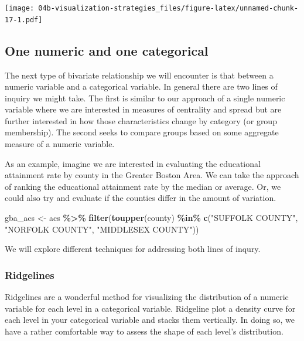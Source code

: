 \documentclass[
]{book}
\newenvironment{Shaded}{\begin{snugshade}}{\end{snugshade}}
\newcommand{\KeywordTok}[1]{\textcolor[rgb]{0.13,0.29,0.53}{\textbf{#1}}}
\newcommand{\NormalTok}[1]{#1}
\newcommand{\OperatorTok}[1]{\textcolor[rgb]{0.81,0.36,0.00}{\textbf{#1}}}
\newcommand{\StringTok}[1]{\textcolor[rgb]{0.31,0.60,0.02}{#1}}
\begin{document}
\texttt{[image: 04b-visualization-strategies\_files/figure-latex/unnamed-chunk-17-1.pdf]}

\hypertarget{one-numeric-and-one-categorical}{%
\subsection{One numeric and one categorical}\label{one-numeric-and-one-categorical}}

The next type of bivariate relationship we will encounter is that between a numeric variable and a categorical variable. In general there are two lines of inquiry we might take. The first is similar to our approach of a single numeric variable where we are interested in measures of centrality and spread but are further interested in how those characteristics change by category (or group membership). The second seeks to compare groups based on some aggregate measure of a numeric variable.

As an example, imagine we are interested in evaluating the educational attainment rate by county in the Greater Boston Area. We can take the approach of ranking the educational attainment rate by the median or average. Or, we could also try and evaluate if the counties differ in the amount of variation.

\begin{Shaded}
\begin{Highlighting}[]
\NormalTok{gba\_acs \textless{}{-}}\StringTok{ }\NormalTok{acs }\OperatorTok{\%\textgreater{}\%}\StringTok{ }
\StringTok{  }\KeywordTok{filter}\NormalTok{(}\KeywordTok{toupper}\NormalTok{(county) }\OperatorTok{\%in\%}\StringTok{ }\KeywordTok{c}\NormalTok{(}\StringTok{"SUFFOLK COUNTY"}\NormalTok{, }\StringTok{"NORFOLK COUNTY"}\NormalTok{, }\StringTok{"MIDDLESEX COUNTY"}\NormalTok{))}
\end{Highlighting}
\end{Shaded}

We will explore different techniques for addressing both lines of inqury.

\hypertarget{ridgelines}{%
\subsubsection{Ridgelines}\label{ridgelines}}

Ridgelines are a wonderful method for visualizing the distribution of a numeric variable for each level in a categorical variable. Ridgeline plot a density curve for each level in your categorical variable and stacks them vertically. In doing so, we have a rather comfortable way to assess the shape of each level's distribution.
\end{document}
